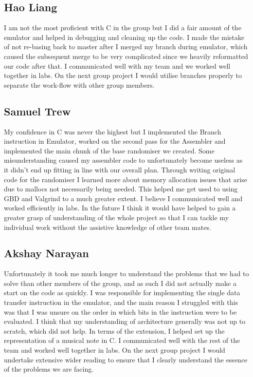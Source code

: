 \documentclass[11pt]{article}
\begin{document}
\subsection{Hao Liang}
I am not the most proficient with C in the group but I did a fair amount of the emulator and helped in debugging and cleaning up the code. I made the mistake of not re-basing back to master after I merged my branch during emulator, which caused the subsequent merge to be very complicated since we heavily reformatted our code after that. I communicated well with my team and we worked well together in labs. On the next group project I would utilise branches properly to separate the work-flow with other group members.

\subsection{Samuel Trew}
My confidence in C was never the highest but I implemented the Branch instruction in Emulator, worked on the second pass for the Assembler and implemented the main chunk of the base randomiser we created. Some misunderstanding caused my assembler code to unfortunately become useless as it didn't end up fitting in line with our overall plan. Through writing original code for the randomiser I learned more about memory allocation issues that arise due to mallocs not necessarily being needed. This helped me get used to using GBD and Valgrind to a much greater extent. I believe I communicated well and worked efficiently in labs. In the future I think it would have helped to gain a greater grasp of understanding of the whole project so that I can tackle my individual work without the assistive knowledge of other team mates.

\subsection{Akshay Narayan}
Unfortunately it took me much longer to understand the problems that we had to solve than other members of the group, and as such I did not actually make a start on the code as quickly. I was responsible for implementing the single data transfer instruction in the emulator, and the main reason I struggled with this was that I was unsure on the order in which bits in the instruction were to be evaluated. I think that my understanding of architecture generally was not up to scratch, which did not help. In terms of the extension, I helped set up the representation of a musical note in C. I communicated well with the rest of the team and worked well together in labs. On the next group project I would undertake extensive wider reading to ensure that I clearly understand the essence of the problems we are facing.
\end{document}
